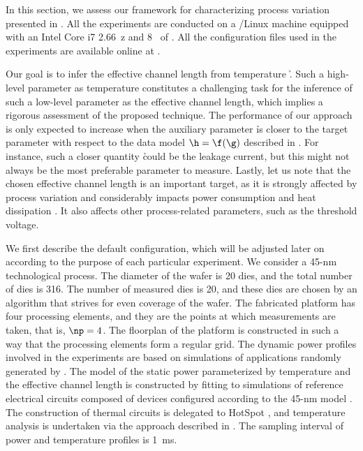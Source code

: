 In this section, we assess our framework for characterizing process variation
presented in . All the experiments are conducted on a
/Linux machine equipped with an Intel Core i7 2.66~z and
8~ of . All the configuration files used in the experiments are
available online at \cite{eslab2014a}.

Our goal is to infer the effective channel length \g from temperature \h. Such a
high-level parameter as temperature constitutes a challenging task for the
inference of such a low-level parameter as the effective channel length, which
implies a rigorous assessment of the proposed technique. The performance of our
approach is only expected to increase when the auxiliary parameter \h is closer
to the target parameter \g with respect to the data model $\h = \f(\g)$
described in . For instance, such a closer quantity \h
could be the leakage current, but this might not always be the most preferable
parameter to measure. Lastly, let us note that the chosen effective channel
length is an important target, as it is strongly affected by process variation
and considerably impacts power consumption and heat dissipation
\cite{chandrakasan2000, srivastava2010, juan2011, juan2012}. It also affects
other process-related parameters, such as the threshold voltage.

We first describe the default configuration, which will be adjusted later on
according to the purpose of each particular experiment. We consider a 45-nm
technological process. The diameter of the wafer is 20 dies, and the total
number of dies \nd is 316. The number of measured dies \hnd is 20, and these
dies are chosen by an algorithm that strives for even coverage of the wafer. The
fabricated platform has four processing elements, and they are the points at
which measurements are taken, that is, $\np = 4$. The floorplan of the platform
is constructed in such a way that the processing elements form a regular grid.
The dynamic power profiles involved in the experiments are based on simulations
of applications randomly generated by  \cite{dick1998}. The model of
the static power parameterized by temperature and the effective channel length
is constructed by fitting to  simulations of reference electrical
circuits composed of  devices \cite{bsim} configured according to the
45-nm   model \cite{ptm}. The construction of thermal 
circuits is delegated to HotSpot \cite{skadron2003}, and temperature analysis is
undertaken via the approach described in . The sampling
interval of power and temperature profiles is 1~ms.

